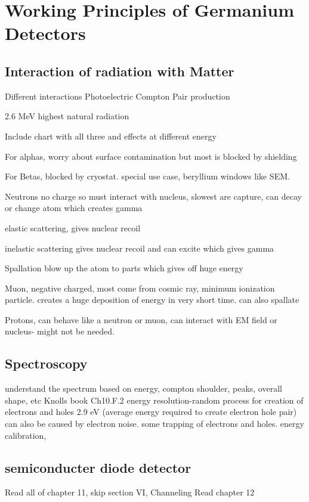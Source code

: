 \chapter{Working Principles of Germanium Detectors}

\section{Interaction of radiation with Matter}
Different interactions
Photoelectric
Compton
Pair production

2.6 MeV highest natural radiation

Include chart with all three and effects at different energy

For alphas, worry about surface contamination but most is blocked by shielding

For Betas, blocked by cryostat. special use case, beryllium windows like SEM.

Neutrons no charge so must interact with nucleus, slowest are capture, can decay or change atom which creates gamma

elastic scattering, gives nuclear recoil

inelastic scattering gives nuclear recoil and can excite which gives gamma

Spallation blow up the atom to parts which gives off huge energy

Muon, negative charged, most come from cosmic ray, minimum ionization particle. creates a huge deposition of energy in very short time. can also spallate

Protons, can behave like a neutron or muon, can interact with EM field or nucleus- might not be needed.

\section{Spectroscopy}

understand the spectrum based on energy, compton shoulder, peaks, overall shape, etc Knolls book Ch10.F.2
energy resolution-random process for creation of electrons and holes 2.9 eV (average energy required to create electron hole pair) can also be caused by electron noise. some trapping of electrons and holes.
energy calibration,

\section{semiconducter diode detector}
Read all of chapter 11, skip section VI, Channeling
Read chapter 12
